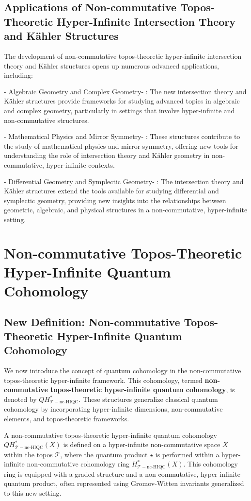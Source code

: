 \documentclass{article}
\begin{document}
\subsection{Applications of Non-commutative Topos-Theoretic Hyper-Infinite Intersection Theory and Kähler Structures}
The development of non-commutative topos-theoretic hyper-infinite intersection theory and Kähler structures opens up numerous advanced applications, including:

-  Algebraic Geometry and Complex Geometry- : The new intersection theory and Kähler structures provide frameworks for studying advanced topics in algebraic and complex geometry, particularly in settings that involve hyper-infinite and non-commutative structures.

-  Mathematical Physics and Mirror Symmetry- : These structures contribute to the study of mathematical physics and mirror symmetry, offering new tools for understanding the role of intersection theory and Kähler geometry in non-commutative, hyper-infinite contexts.

-  Differential Geometry and Symplectic Geometry- : The intersection theory and Kähler structures extend the tools available for studying differential and symplectic geometry, providing new insights into the relationships between geometric, algebraic, and physical structures in a non-commutative, hyper-infinite setting.



\section{Non-commutative Topos-Theoretic Hyper-Infinite Quantum Cohomology}
\subsection{New Definition: Non-commutative Topos-Theoretic Hyper-Infinite Quantum Cohomology}
We now introduce the concept of quantum cohomology in the non-commutative topos-theoretic hyper-infinite framework. This cohomology, termed \textbf{non-commutative topos-theoretic hyper-infinite quantum cohomology}, is denoted by \(QH_{\mathcal{T}-\text{nc-HIQC}}^{*}\). These structures generalize classical quantum cohomology by incorporating hyper-infinite dimensions, non-commutative elements, and topos-theoretic frameworks.

A non-commutative topos-theoretic hyper-infinite quantum cohomology \(QH_{\mathcal{T}-\text{nc-HIQC}}^{*}(X)\) is defined on a hyper-infinite non-commutative space \(X\) within the topos \(\mathcal{T}\), where the quantum product \(\star\) is performed within a hyper-infinite non-commutative cohomology ring \(H_{\mathcal{T}-\text{nc-HIQC}}^{*}(X)\). This cohomology ring is equipped with a graded structure and a non-commutative, hyper-infinite quantum product, often represented using Gromov-Witten invariants generalized to this new setting.
\end{document}
